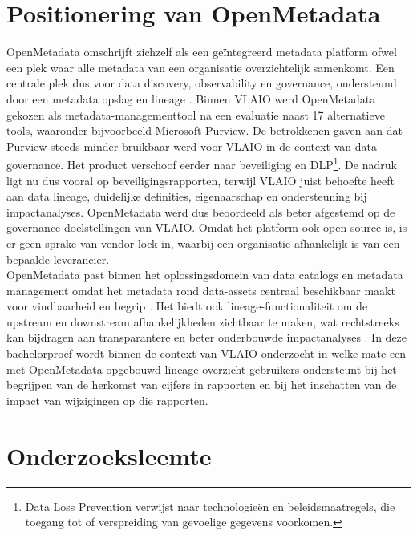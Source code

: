 \section{Positionering van OpenMetadata}

OpenMetadata omschrijft zichzelf als een geïntegreerd metadata platform ofwel een plek waar alle metadata van een organisatie overzichtelijk samenkomt. Een centrale plek dus voor data discovery, observability en governance, ondersteund door een metadata opslag en lineage \autocite{OpenMetadataDocs2024}. Binnen VLAIO werd OpenMetadata gekozen als metadata-managementtool na een evaluatie naast 17 alternatieve tools, waaronder bijvoorbeeld Microsoft Purview. De betrokkenen gaven aan dat Purview steeds minder bruikbaar werd voor VLAIO in de context van data governance. Het product verschoof eerder naar beveiliging en DLP\footnote{Data Loss Prevention verwijst naar technologieën en beleidsmaatregels, die toegang tot of verspreiding van gevoelige gegevens voorkomen.}. De nadruk ligt nu dus vooral op beveiligingsrapporten, terwijl VLAIO juist behoefte heeft aan data lineage, duidelijke definities, eigenaarschap en ondersteuning bij impactanalyses. OpenMetadata werd dus beoordeeld als beter afgestemd op de go\-ver\-nance-doel\-stel\-ling\-en van VLAIO. Omdat het platform ook open-source is, is er geen sprake van vendor lock-in, waarbij een organisatie afhankelijk is van een bepaalde leverancier.\\

OpenMetadata past binnen het oplossingsdomein van data catalogs en metadata management omdat het metadata rond data-assets centraal beschikbaar maakt voor vindbaarheid en begrip \autocite{eichler2021enterprise}. Het biedt ook lineage-functionaliteit om de upstream en downstream afhankelijkheden zich\-tbaar te maken, wat recht\-streeks kan bijdragen aan transparantere en beter onderbouwde impactanalyses \autocite{verma2024tracing,OpenMetadataDocs2024}. In deze bachelorproef wordt binnen de context van VLAIO onderzocht in welke mate een met OpenMetadata opgebouwd lineage-overzicht gebruikers ondersteunt bij het begrijpen van de herkomst van cijfers in rapporten en bij het inschatten van de impact van wijzigingen op die rapporten.\\


\section{Onderzoeksleemte}


